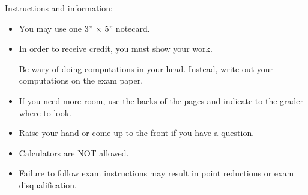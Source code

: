\documentclass[12pt]{article}
\begin{document}
\bigskip

\begin{center}
\begin{Large}
Instructions and information:
\end{Large}
\end{center}

\begin{itemize}


\item You may use one 3'' $\times$ 5'' notecard.
\item
In order to receive credit, you must show your work. %


Be wary of doing computations in your head. Instead, write out your
computations on the exam paper.
%

\item
If you need more room, use the backs of the pages and indicate to the
grader where to look.

\item
Raise your hand or come up to the front if you have a question.

\item Calculators are NOT allowed.

\item Failure to follow exam instructions may result in point reductions or exam disqualification.
\end{itemize}

\end{document}
